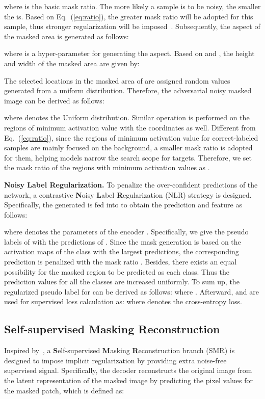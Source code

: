 \documentclass[10pt,twocolumn,letterpaper]{article}
\begin{document}
where  is the basic mask ratio. {The more likely a sample is to be noisy, the smaller the  is. Based on Eq.~(\ref{eq:ratio}), the greater mask ratio will be adopted for this sample, thus stronger regularization will be imposed~\cite{li2020dividemix}}. Subsequently, the aspect of the masked area  is generated as follows:

where  is a hyper-parameter for generating the aspect. Based on  and , the height and width of the masked area are given by:

The selected locations in the masked area of  are assigned random values generated from a uniform distribution. Therefore, the adversarial noisy masked image  can be derived as follows:

where  denotes the Uniform distribution. Similar operation is performed on the regions of minimum activation value with the coordinates  as well. Different from Eq.~(\ref{eq:ratio}), since the regions of minimum activation value for correct-labeled samples are mainly focused on the background, a smaller mask ratio is adopted for them, helping models narrow the search scope for targets. Therefore, we set the mask ratio of the regions with minimum activation values as . 



\textbf{Noisy {Label} Regularization.} To penalize the {over-confident} predictions of the network, a contrastive \textbf{N}oisy \textbf{L}abel \textbf{R}egularization (NLR) strategy is designed. Specifically, the generated  is fed into  to obtain the prediction  and feature  as follows:

where  denotes the parameters of the encoder . Specifically, we give the pseudo labels of  with the predictions of . Since the mask generation is based on the activation maps of the class with the largest predictions, the corresponding prediction is penalized with the mask ratio . Besides, there exists an equal possibility for the masked region to be predicted as each class. Thus the prediction values for all the classes are increased uniformly. To sum up, the regularized pseudo label  for  can be derived as follows:
{}where . Afterward,  and  are used for supervised loss calculation as:
{}
where  denotes the cross-entropy loss.
\vspace{-2mm}
\subsection{Self-supervised Masking Reconstruction}
Inspired by~\cite{he2021masked}, a \textbf{S}elf-supervised \textbf{M}asking \textbf{R}econstruction branch (SMR) is designed to impose implicit regularization by providing extra noise-free supervised signal. Specifically, the decoder  reconstructs the original image from the latent representation of the masked image  by predicting the pixel values for the masked patch, which is defined as:
\end{document}
